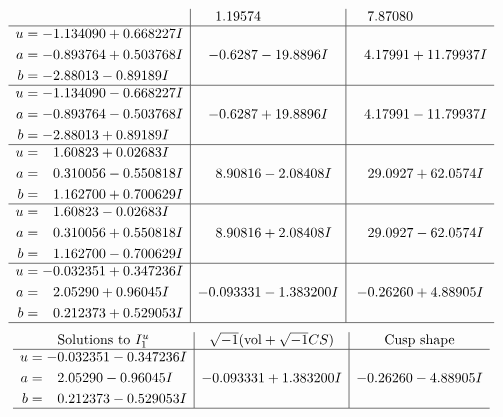 \documentclass[1p]{elsarticle_modified}
\theoremstyle{definition}
\newcommand{\I}{\sqrt{-1}}
\begin{document}
$$\begin{array}{c|c|c}
 & \phantom{-}1.19574\phantom{ +0.000000I} & \phantom{-}7.87080\phantom{ +0.000000I} \\ \hline\begin{aligned}
u &= -1.134090 + 0.668227 I \\
a &= -0.893764 + 0.503768 I \\
b &= -2.88013 - 0.89189 I\end{aligned}
 & -0.6287 - 19.8896 I & \phantom{-}4.17991 + 11.79937 I \\ \hline\begin{aligned}
u &= -1.134090 - 0.668227 I \\
a &= -0.893764 - 0.503768 I \\
b &= -2.88013 + 0.89189 I\end{aligned}
 & -0.6287 + 19.8896 I & \phantom{-}4.17991 - 11.79937 I \\ \hline\begin{aligned}
u &= \phantom{-}1.60823 + 0.02683 I \\
a &= \phantom{-}0.310056 - 0.550818 I \\
b &= \phantom{-}1.162700 + 0.700629 I\end{aligned}
 & \phantom{-}8.90816 - 2.08408 I & \phantom{-}29.0927 + 62.0574 I \\ \hline\begin{aligned}
u &= \phantom{-}1.60823 - 0.02683 I \\
a &= \phantom{-}0.310056 + 0.550818 I \\
b &= \phantom{-}1.162700 - 0.700629 I\end{aligned}
 & \phantom{-}8.90816 + 2.08408 I & \phantom{-}29.0927 - 62.0574 I \\ \hline\begin{aligned}
u &= -0.032351 + 0.347236 I \\
a &= \phantom{-}2.05290 + 0.96045 I \\
b &= \phantom{-}0.212373 + 0.529053 I\end{aligned}
 & -0.093331 - 1.383200 I & -0.26260 + 4.88905 I\\
 \hline 
 \end{array}$$\newpage$$\begin{array}{c|c|c}  
\text{Solutions to }I^u_{1}& \I (\text{vol} + \sqrt{-1}CS) & \text{Cusp shape}\\
 \hline 
\begin{aligned}
u &= -0.032351 - 0.347236 I \\
a &= \phantom{-}2.05290 - 0.96045 I \\
b &= \phantom{-}0.212373 - 0.529053 I\end{aligned}
 & -0.093331 + 1.383200 I & -0.26260 - 4.88905 I\\
 \hline 
 \end{array}$$\newpage\newpage\renewcommand{\arraystretch}{1}
\end{document}
